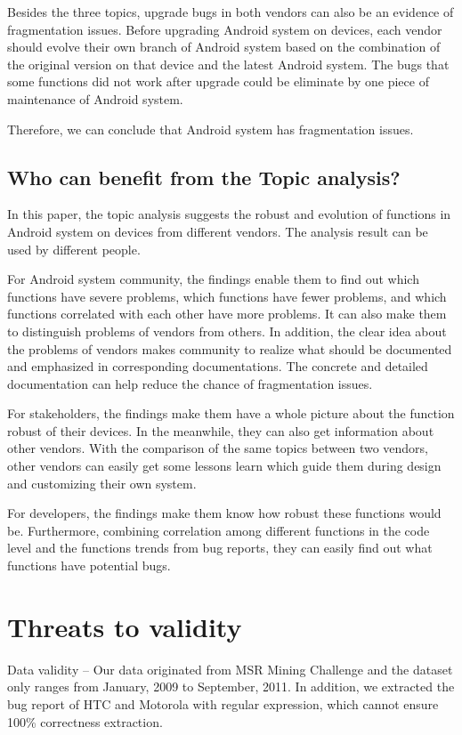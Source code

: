 \documentclass[10pt, conference, compsocconf]{IEEEtran}
\begin{document}
Besides the three topics, upgrade bugs in both vendors can also be an evidence of fragmentation issues. Before upgrading Android system on devices, each vendor should evolve their own branch of Android system based on the combination of the original version on that device and the latest Android system. The bugs that some functions did not work after upgrade could be eliminate by one piece of maintenance of Android system. 

Therefore, we can conclude that Android system has fragmentation issues.

\subsection{Who can benefit from the Topic analysis?}

In this paper, the topic analysis suggests the robust and evolution of functions in Android system on devices from different vendors. The analysis result can be used by different people.
	
For Android system community, the findings enable them to find out which functions have severe problems, which functions have fewer problems, and which functions correlated with each other have more problems. It can also make them to distinguish problems of vendors from others. In addition, the clear idea about the problems of vendors makes community to realize what should be documented and emphasized in corresponding documentations. The concrete and detailed documentation can help reduce the chance of fragmentation issues.

For stakeholders, the findings make them have a whole picture about the function robust of their devices. In the meanwhile, they can also get information about other vendors. With the comparison of the same topics between two vendors, other vendors can easily get some lessons learn which guide them during design and customizing their own system.

For developers, the findings make them know how robust these functions would be. Furthermore, combining correlation among different functions in the code level and the functions trends from bug reports, they can easily find out what functions have potential bugs.

\section{Threats to validity}

Data validity – Our data originated from MSR Mining Challenge \cite{MSRChallenge2012} and the dataset only ranges from January, 2009 to September, 2011. In addition, we extracted the bug report of HTC and Motorola with regular expression, which cannot ensure 100\% correctness extraction. 
\end{document}
